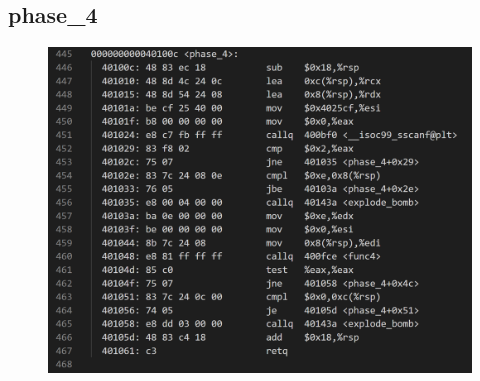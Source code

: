 \documentclass[12pt, a4paper, oneside]{ctexart}
\begin{document}
\subsection{phase\_4}
\begin{figure}[htbp]
    \includegraphics[scale=0.4]{image/2.5-1.png}
\end{figure}
\end{document}

